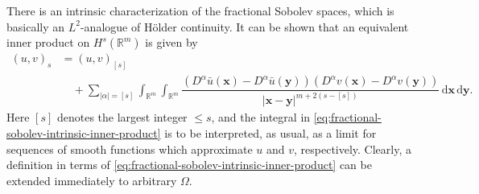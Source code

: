 There is an intrinsic characterization of the fractional Sobolev spaces, which is basically an $L^2$-analogue of Hölder continuity. It can be shown that an equivalent inner product on $H^s(\mathbb{R}^m)$ is given by
\begin{equation}\label{eq:fractional-sobolev-intrinsic-inner-product}
\begin{aligned}
(u,v)_s&=(u,v)_{[s]}\\
&\quad+\sum_{|\alpha|=[s]}\int_{\mathbb{R}^m}\int_{\mathbb{R}^m}
\dfrac{(D^\alpha\bar u(\bm{x})-D^\alpha\bar u(\bm{y}))(D^\alpha v(\bm{x})-D^\alpha v(\bm{y}))}{|\bm{x}-\bm{y}|^{m+2(s-[s])}}\,\mathrm{d}\bm{x}\,\mathrm{d}\bm{y}.
\end{aligned}
\end{equation}
Here $[s]$ denotes the largest integer $\leq s$, and the integral in \eqref{eq:fractional-sobolev-intrinsic-inner-product} is to be interpreted, as usual, as a limit for sequences of smooth functions which approximate $u$ and $v$, respectively. Clearly, a definition in terms of \eqref{eq:fractional-sobolev-intrinsic-inner-product} can be extended immediately to arbitrary $\Omega$.

